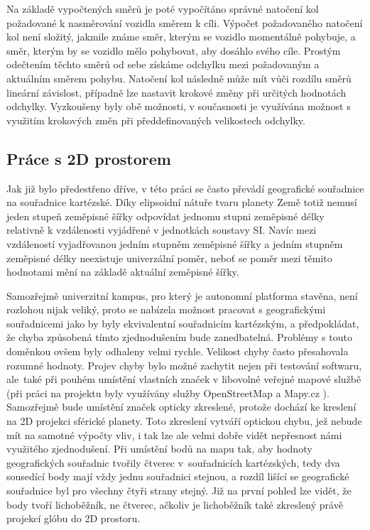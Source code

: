 \documentclass[czech, bachelor]{diploma}
\begin{document}
Na základě vypočtených směrů je poté vypočítáno správné natočení kol požadované k nasměrování vozidla směrem k cíli. Výpočet
požadovaného natočení kol není složitý, jakmile známe směr, kterým se vozidlo momentálně pohybuje, a směr, kterým by se vozidlo
mělo pohybovat, aby dosáhlo svého cíle. Prostým odečtením těchto směrů od sebe získáme odchylku mezi požadovaným a aktuálním
směrem pohybu. Natočení kol následně může mít vůči rozdílu směrů lineární závislost, případně lze nastavit krokové změny
při určitých hodnotách odchylky. Vyzkoušeny byly obě možnosti, v současnosti je využívána možnost s využitím krokových změn při
předdefinovaných velikostech odchylky.

\subsection{Práce s 2D prostorem} \label{cartesian-coordinates}

Jak již bylo předestřeno dříve, v této práci se často převádí geografické souřadnice na souřadnice kartézské. Díky elipsoidní
nátuře tvaru planety Země totiž nemusí jeden stupeň zeměpisné šířky odpovídat jednomu stupni zeměpisné délky relativně
k vzdálenosti vyjádřené v jednotkách soustavy SI. Navíc mezi vzdáleností vyjadřovanou jedním stupněm zeměpisné šířky a jedním
stupněm zeměpisné délky neexistuje univerzální poměr, neboť se poměr mezi těmito hodnotami mění na základě aktuální zeměpisné
šířky.

Samozřejmě univerzitní kampus, pro který je autonomní platforma stavěna, není rozlohou nijak veliký, proto se nabízela možnost
pracovat s geografickými souřadnicemi jako by byly ekvivalentní souřadnicím kartézským, a předpokládat, že chyba způsobená tímto
zjednodušením bude zanedbatelná. Problémy s touto doměnkou ovšem byly odhaleny velmi rychle. Velikost chyby často přesahovala
rozumné hodnoty. Projev chyby bylo možné zachytit nejen při testování softwaru, ale~také při pouhém umístění vlastních značek
v libovolné veřejné mapové službě (při práci na projektu byly využívány služby OpenStreetMap \cite{openstreetmap-source} a Mapy.cz
\cite{mapycz-source}). Samozřejmě bude umístění značek opticky zkreslené, protože dochází ke kreslení na 2D projekci sférické
planety. Toto zkreslení vytváří optickou chybu, jež nebude mít na samotné výpočty vliv, i tak lze ale velmi dobře vidět nepřesnost
námi využitého zjednodušení. Při umístění bodů na mapu tak, aby hodnoty geografických souřadnic tvořily čtverec v~souřadnicích
kartézských, tedy dva sousedící body mají vždy jednu souřadnici stejnou, a rozdíl lišící se geografické souřadnice byl pro všechny
čtyři strany stejný. Již na první pohled lze vidět, že body tvoří lichoběžník, ne čtverec, ačkoliv je lichoběžník také zkreslený
právě projekcí glóbu do 2D prostoru.
\end{document}
